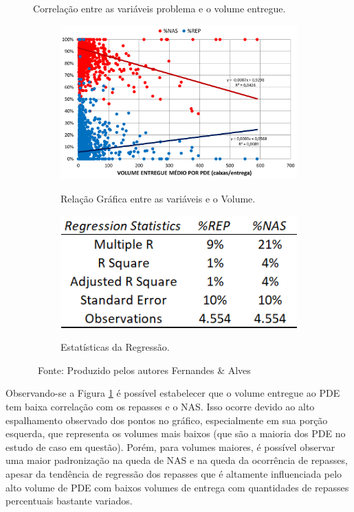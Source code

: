 \begin{figure}[H]
     \caption{Correlação entre as variáveis problema e o volume entregue.}
     \begin{subfigure}{.64\textwidth}
         \centering
         \caption{Relação Gráfica entre as variáveis e o Volume.}
         \includegraphics[width=.98\linewidth]{images/5_emp_bebidas/excel_based/Volume.png}
         \label{fig:Volume}
     \end{subfigure}
     \begin{subfigure}{.35\textwidth}
       \centering
       \caption{Estatísticas da Regressão.}
       \includegraphics[width=.88\linewidth]{images/5_emp_bebidas/excel_based/Volume_RS.png}
       \label{fig:VolumeRS}
     \end{subfigure}
     \caption*{\ Fonte: Produzido pelos autores Fernandes \& Alves}
\end{figure} %

Observando-se a Figura \ref{fig:Volume} é possível estabelecer que o volume entregue ao PDE tem baixa correlação com os repasses e o NAS. Isso ocorre devido ao alto espalhamento observado dos pontos no gráfico, especialmente em sua porção esquerda, que representa os volumes mais baixos (que são a maioria dos PDE no estudo de caso em questão). Porém, para volumes maiores, é possível observar uma maior padronização na queda de NAS e na queda da ocorrência de repasses, apesar da tendência de regressão dos repasses que é altamente influenciada pelo alto volume de PDE com baixos volumes de entrega com quantidades de repasses percentuais bastante variados.

